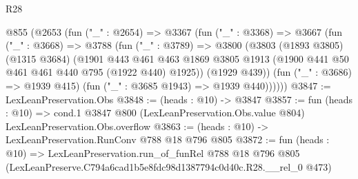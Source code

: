 \begin{lexlean}{R28}
\begin{coremodule}
  @855
    (@2653
      (fun ("_" : @2654) =>
      @3367
        (fun ("_" : @3368) =>
        @3667
          (fun ("_" : @3668) =>
          @3788
            (fun ("_" : @3789) =>
            @3800
              (@3803
                (@1893 @3805)
                (@1315 @3684)
                (@1901
                  @443
                  @461
                  @463
                  @1869
                  @3805
                  @1913
                  (@1900 @441 @50 @461 @461 @440 @795 (@1922 @440) @1925))
                (@1929 @439))
              (fun ("_" : @3686) => @1939 @415)
              (fun ("_" : @3685 @1943) => @1939 @440))))))
@3847 := LexLeanPreservation.Obs
@3848 := (heads : @10) -> @3847
@3857 := fun (heads : @10) =>
  cond.{1} @3847 @800 (LexLeanPreservation.Obs.value @804) LexLeanPreservation.Obs.overflow
@3863 := (heads : @10) -> LexLeanPreservation.RunConv @788 @18 @796 @805
@3872 := fun (heads : @10) =>
  LexLeanPreservation.run_of_funRel
    @788
    @18
    @796
    @805
    (LexLeanPreserve.C794a6cad1b5e8fdc98d1387794c0d40c.R28.__rel_0 @473)
\end{coremodule}
\end{lexlean}

